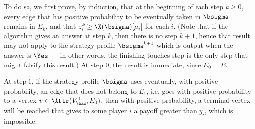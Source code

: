 \begin{itemize}
        To do so, we first prove, by induction, that at the beginning of each step $k \geq 0$, every edge that has positive probability to be eventually taken in $\bsigma$ remains in $E_k$, and that $z^k_i \geq \X(\bsigma)[\mu_i]$ for each $i$.
        (Note that if the algorithm gives an answer at step $k$, then there is no step $k+1$, hence that result may not apply to the strategy profile $\bsigma^{k+1}$ which is output when the answer is $\Yes$ --- in other words, the finishing touches step is the only step that might falsify this result.)
        At step $0$, the result is immediate, since $E_0 = E$.


        At step $1$, if the strategy profile $\bsigma$ uses eventually, with positive probability, an edge that does not belong to $E_1$, i.e. goes with positive probability to a vertex $v \in \Attr(V^0_\bad, E_0)$, then with positive probability, a terminal vertex will be reached that gives to some player $i$ a payoff greater than $y_i$, which is impossible.
        

\end{itemize}
